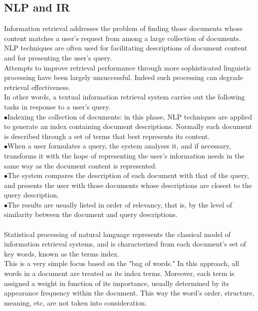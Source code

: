\subsection{NLP and IR}
Information retrieval addresses the problem of finding those documents whose content matches a user's request from among a large collection of documents.
NLP techniques are often used for facilitating descriptions of document content and for presenting the user's query.\\Attempts to improve retrieval performance through more sophisticated linguistic processing have been largely unsuccessful. Indeed such processing can degrade retrieval effectiveness.\\
In other words, a textual information retrieval system carries out the following tasks in response to a user's query.\\
\indent$\bullet$\hspace{5pt}Indexing the collection of documents: in this phase, NLP techniques are applied to generate an index containing document descriptions. Normally each document is described through a set of terms that best represents its content.\\
\indent$\bullet$\hspace{5pt}When a user formulates a query, the system analyses it, and if necessary, transforms it with the hope of representing the user's information needs in the same way as the document content is represented.\\
\indent$\bullet$\hspace{5pt}The system compares the description of each document with that of the query, and presents the user with those documents whose descriptions are closest to the query description.\\
\indent$\bullet$\hspace{5pt}The results are usually listed in order of relevancy, that is, by the level of similarity between the document and query descriptions.
\\\\
Statistical processing of natural language represents the classical model of information retrieval systems, and is characterized from each document's set of key words, known as the terms index.\\
This is a very simple focus based on the "bag of words." In this approach, all words in a document are treated as its index terms. Moreover, each term is assigned a weight in function of its importance, usually determined by its appearance frequency within the document. This way the word's order, structure, meaning, etc, are not taken into consideration.\\
